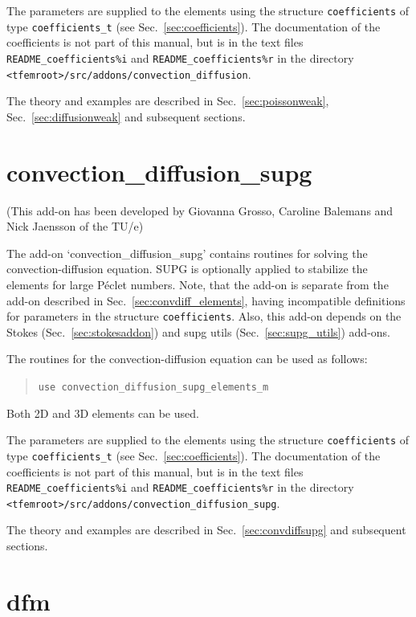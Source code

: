 The parameters are
supplied to the elements using the structure \texttt{coefficients} of type
\texttt{coefficients\_t} (see Sec.~\ref{sec:coefficients}). The documentation
of the coefficients is not part of this manual, but is in the text files
\texttt{README\_coefficients\%i} and
\texttt{README\_coefficients\%r} in the directory
\texttt{<tfemroot>/src/addons/convection\_diffusion}.

The theory and examples are described in Sec.~\ref{sec:poissonweak},
Sec.~\ref{sec:diffusionweak} and subsequent sections.

\section{convection\_diffusion\_supg}
\label{sec:convdiff_elements_supg}

(This add-on has been developed by Giovanna Grosso, Caroline Balemans and Nick Jaensson of the TU/e)

The add-on `convection\_diffusion\_supg' contains routines for solving
the convection-diffusion equation. SUPG is optionally applied to stabilize the elements
for large P\'eclet numbers. Note, that the add-on is separate from the add-on
described in Sec.~\ref{sec:convdiff_elements}, having incompatible definitions for parameters in
the structure \texttt{coefficients}. Also, this add-on depends on the Stokes (Sec.~\ref{sec:stokesaddon}) and
supg utils (Sec.~\ref{sec:supg_utils}) add-ons.

The routines for the convection-diffusion equation can be used as follows:
\begin{quote}
   \texttt{use convection\_diffusion\_supg\_elements\_m}
\end{quote}
Both 2D and 3D elements can be used.

The parameters are
supplied to the elements using the structure \texttt{coefficients} of type
\texttt{coefficients\_t} (see Sec.~\ref{sec:coefficients}). The documentation
of the coefficients is not part of this manual, but is in the text files
\texttt{README\_coefficients\%i} and
\texttt{README\_coefficients\%r} in the directory
\texttt{<tfemroot>/src/addons/convection\_diffusion\_supg}.

The theory and examples are described in
Sec.~\ref{sec:convdiffsupg} and subsequent sections.

\section{dfm}
\label{sec:deformationfields}

